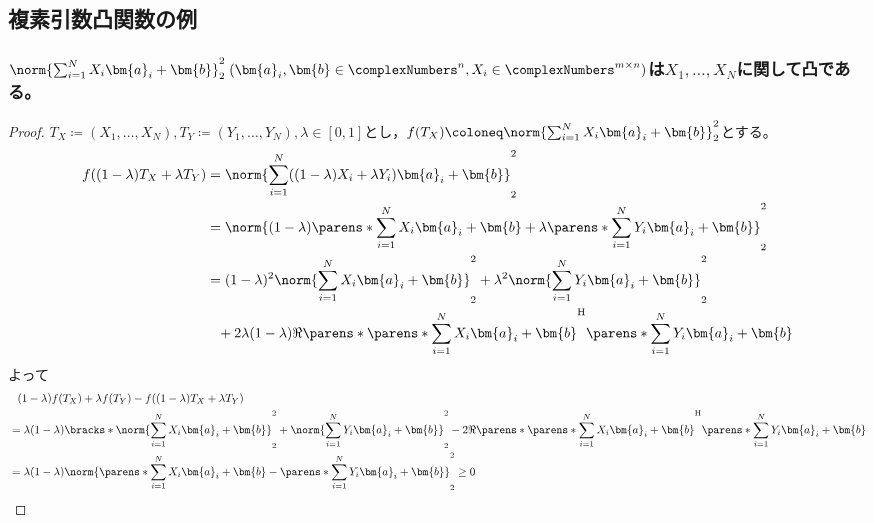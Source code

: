         \subsection{複素引数凸関数の例}
            \label{複素引数凸関数の例}
            \subsubsection{\texorpdfstring{$\norm{\sum_{i=1}^N X_i\bm{a}_i + \bm{b}}_2^2\;(\bm{a}_i, \bm{b} \in \complexNumbers^n,X_i \in \complexNumbers^{m\times n})$}{行列X1,X2,...,XNの線形結合×ベクトル+定数のノルム}は\texorpdfstring{$X_1,\dotsc,X_N$}{X1,X2,...,XN}に関して凸である。}
                \begin{proof}
                    $T_X \coloneq (X_1,\dotsc,X_N),T_Y \coloneq (Y_1,\dotsc,Y_N),\lambda \in [0,1]$とし，$f(T_X) \coloneq \norm{\sum_{i=1}^N X_i\bm{a}_i + \bm{b}}_2^2$とする。
                    \begin{align*}
                        f((1-\lambda)T_X + \lambda T_Y) &= \norm{\sum_{i=1}^N ((1-\lambda)X_i + \lambda Y_i)\bm{a}_i + \bm{b}}_2^2 \\
                        &= \norm{(1-\lambda)\parens*{\sum_{i=1}^N X_i\bm{a}_i + \bm{b}} + \lambda\parens*{\sum_{i=1}^N Y_i\bm{a}_i + \bm{b}}}_2^2 \\
                        &= (1-\lambda)^2\norm{\sum_{i=1}^N X_i\bm{a}_i + \bm{b}}_2^2 + \lambda^2\norm{\sum_{i=1}^N Y_i\bm{a}_i + \bm{b}}_2^2 \\
                        &\phantom{=} + 2\lambda(1-\lambda)\Re\parens*{\parens*{\sum_{i=1}^N X_i\bm{a}_i + \bm{b}}^\mathrm{H}\parens*{\sum_{i=1}^N Y_i\bm{a}_i + \bm{b}}}
                    \end{align*}
                    よって
                    \begin{align*}
                        &\phantom{=} (1-\lambda)f(T_X) + \lambda f(T_Y) - f((1-\lambda)T_X + \lambda T_Y) \\
                        &= \lambda(1-\lambda)\bracks*{\norm{\sum_{i=1}^N X_i\bm{a}_i + \bm{b}}_2^2 + \norm{\sum_{i=1}^N Y_i\bm{a}_i + \bm{b}}_2^2 - 2\Re\parens*{\parens*{\sum_{i=1}^N X_i\bm{a}_i + \bm{b}}^\mathrm{H}\parens*{\sum_{i=1}^N Y_i\bm{a}_i + \bm{b}}}} \\
                        &= \lambda(1-\lambda)\norm{\parens*{\sum_{i=1}^N X_i\bm{a}_i + \bm{b}} - \parens*{\sum_{i=1}^N Y_i\bm{a}_i + \bm{b}}}_2^2 \geq 0
                    \end{align*}
                \end{proof}
